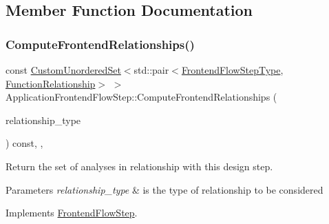 \subsection{Member Function Documentation}
\mbox{\label{classApplicationFrontendFlowStep_ab308200c0096ccff3a1ff50e864ed61f}} 
\subsubsection{\texorpdfstring{Compute\+Frontend\+Relationships()}{ComputeFrontendRelationships()}}
{\footnotesize\ttfamily const \hyperlink{classCustomUnorderedSet}{Custom\+Unordered\+Set}$<$std\+::pair$<$\hyperlink{frontend__flow__step_8hpp_afeb3716c693d2b2e4ed3e6d04c3b63bb}{Frontend\+Flow\+Step\+Type}, \hyperlink{classFrontendFlowStep_af7cf30f2023e5b99e637dc2058289ab0}{Function\+Relationship}$>$ $>$ Application\+Frontend\+Flow\+Step\+::\+Compute\+Frontend\+Relationships (\begin{DoxyParamCaption}\item[{const \hyperlink{classDesignFlowStep_a723a3baf19ff2ceb77bc13e099d0b1b7}{Design\+Flow\+Step\+::\+Relationship\+Type}}]{relationship\+\_\+type }\end{DoxyParamCaption}) const\hspace{0.3cm}{\ttfamily [override]}, {\ttfamily [private]}, {}}



Return the set of analyses in relationship with this design step. 


\begin{DoxyParams}{Parameters}
{\em relationship\+\_\+type} & is the type of relationship to be considered \\
\hline
\end{DoxyParams}


Implements \hyperlink{classFrontendFlowStep_abeaff70b59734e462d347ed343dd700d}{Frontend\+Flow\+Step}.



